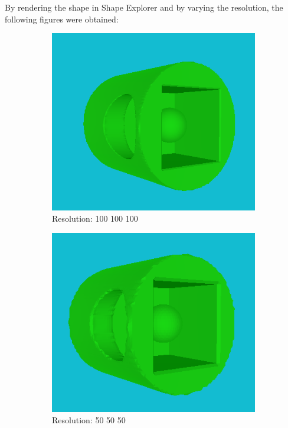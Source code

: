 \documentclass[acmlarge,nonacm=true]{acmart}
\begin{document}
By rendering the shape in Shape Explorer and by varying the resolution, the following 
figures were obtained:\\
\begin{figure}[H]
	\begin{subfigure}{.33\textwidth}
	  \centering
	  \includegraphics[width=.8\linewidth]{fig/2_100_100_100}
	  \caption{Resolution: 100 100 100}
	\end{subfigure}%
	\begin{subfigure}{.33\textwidth}
	  \centering
	  \includegraphics[width=.8\linewidth]{fig/2_50_50_50}
	  \caption{Resolution: 50 50 50}
	\end{subfigure}
	\begin{subfigure}{.33\textwidth}
		\centering

\end{subfigure}
\end{figure}
\end{document}
